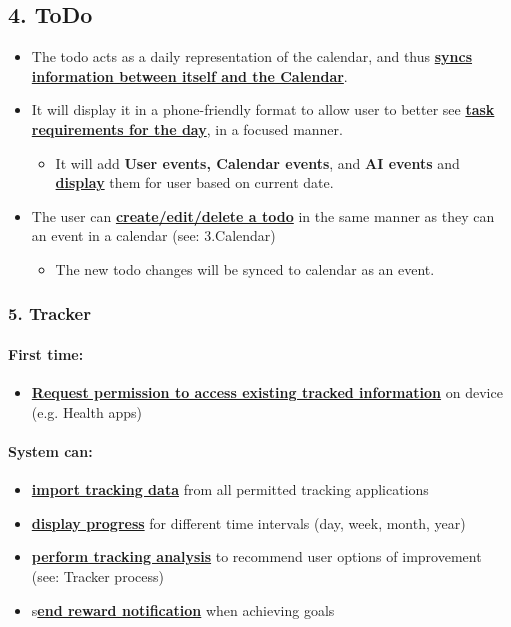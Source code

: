 \documentclass[a4paper,11pt]{article} %
\begin{document}
\subsection*{4. ToDo}
\begin{itemize}
  \item The todo acts as a daily representation of the calendar, and thus \textbf{\ul{syncs information between itself and the Calendar}}.
  \item It will display it in a phone-friendly format to allow user to better see \textbf{\ul{task requirements for the day}}, in a focused manner.
  \begin{itemize}
    \item It will add \textbf{User events, Calendar events}, and \textbf{AI events} and \textbf{\ul{display}} them for user based on current date.
  \end{itemize}
  \item The user can \textbf{\ul{create/edit/delete a todo}} in the same manner as they can an event in a calendar (see: 3.Calendar)
  \begin{itemize}
    \item The new todo changes will be synced to calendar as an event.
  \end{itemize}
\end{itemize}


\subsubsection*{5. Tracker}

\paragraph{First time:}
\begin{itemize}
  \item \textbf{\ul{Request permission to access existing tracked information}} on device (e.g. Health apps)
\end{itemize} 

\paragraph{System can:}
\begin{itemize}
  \item \textbf{\ul{import tracking data}} from all permitted tracking applications
  \item \textbf{\ul{display progress}} for different time intervals (day, week, month, year)
  \item \textbf{\ul{perform tracking analysis}} to recommend user options of improvement (see: Tracker process)
  \item s\textbf{\ul{end reward notification}} when achieving goals
\end{itemize}
\end{document}
